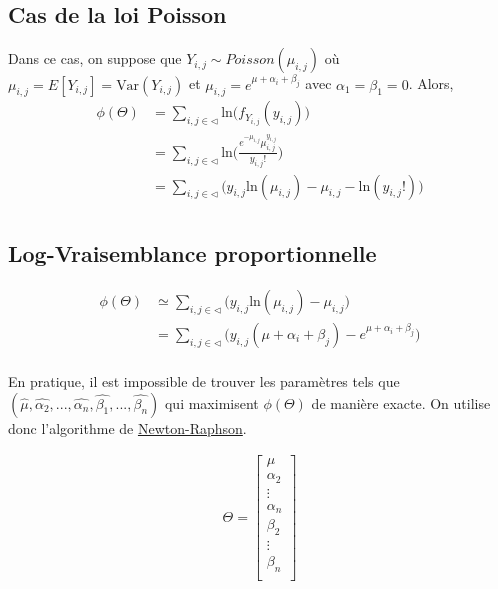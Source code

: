 \documentclass[11pt,french]{report}
\newcommand{\fact}[1]{#1\mathpunct{}!}
\begin{document}
\subsection*{Cas de la loi Poisson}
Dans ce cas, on suppose que $Y_{i,j} \sim Poisson(\mu_{i,j})$ où $\mu_{i,j} = E[Y_{i,j}] = \text{Var}(Y_{i,j})$ et $\mu_{i,j} = e^{\mu + \alpha_i + \beta_j}$ avec $\alpha_1 = \beta_1 = 0$.
Alors, 
\begin{align*}
\phi(\Theta) &= \sum_{i, j \in \triangleleft} \text{ln} \big(f_{Y_{i,j}}(y_{i,j}) \big) \\
&= \sum_{i, j \in \triangleleft} \text{ln} \Bigg( \frac{e^{-\mu_{i,j}} \mu_{i,j}^{y_{i,j}}}{\fact{ y_{i,j}}} \Bigg) \\
&= \sum_{i, j \in \triangleleft} \Bigg( y_{i,j} \text{ln}(\mu_{i,j}) -\mu_{i,j} - \text{ln}(\fact{ y_{i,j}}) \Bigg) \\
\end{align*}

\subsection*{Log-Vraisemblance proportionnelle}
\begin{align*}
\phi(\Theta) &\simeq \sum_{i, j \in \triangleleft} \Bigg( y_{i,j} \text{ln}(\mu_{i,j}) -\mu_{i,j} \Bigg) \\
&= \sum_{i, j \in \triangleleft} \Bigg( y_{i,j} (\mu + \alpha_i + \beta_j) - e^{\mu + \alpha_i + \beta_j} \Bigg) \\
\end{align*}

En pratique, il est impossible de trouver les paramètres tels que $( \widehat{\mu}, \widehat{\alpha_2}, ..., \widehat{\alpha_n}, \widehat{\beta_1},..., \widehat{\beta_n})$ qui maximisent $\phi(\Theta)$ de manière exacte. On utilise donc l'algorithme de  \href{https://fr.wikipedia.org/wiki/Méthode_de_Newton}{Newton-Raphson}.

\begin{align*}
\Theta =
\begin{bmatrix} 
\mu \\
\alpha_2 \\
\vdots \\
\alpha_n \\
\beta_2 \\
\vdots \\
\beta_n \\
\end{bmatrix}
\end{align*}
\end{document}
